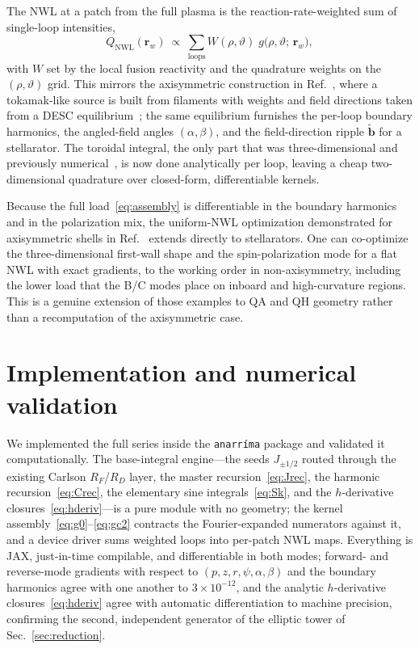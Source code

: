 \documentclass[11pt]{article}
\newcommand{\rw}{\bm{r}_w}
\newcommand{\bperp}{\tilde{\bm{b}}}
\newcommand{\NWL}{\mathrm{NWL}}
\newcommand{\Ja}[1]{J_{#1}}
\begin{document}
The NWL at a patch from the full plasma is the reaction-rate-weighted sum of single-loop intensities,
\begin{equation}
Q_{\NWL}(\rw)\ \propto\ \sum_{\text{loops}} W(\rho,\vartheta)\;g\big(\rho,\vartheta;\,\rw\big),
\label{eq:assembly}
\end{equation}
with $W$ set by the local fusion reactivity and the quadrature weights on the $(\rho,\vartheta)$ grid. This mirrors the axisymmetric construction in Ref.~\cite{schwartz2025}, where a tokamak-like source is built from filaments with weights and field directions taken from a DESC equilibrium~\cite{desc2023}; the same equilibrium furnishes the per-loop boundary harmonics, the angled-field angles $(\alpha,\beta)$, and the field-direction ripple $\bperp$ for a stellarator. The toroidal integral, the only part that was three-dimensional and previously numerical~\cite{lion2022}, is now done analytically per loop, leaving a cheap two-dimensional quadrature over closed-form, differentiable kernels.

Because the full load~\eqref{eq:assembly} is differentiable in the boundary harmonics and in the polarization mix, the uniform-NWL optimization demonstrated for axisymmetric shells in Ref.~\cite{schwartz2025} extends directly to stellarators. One can co-optimize the three-dimensional first-wall shape and the spin-polarization mode for a flat NWL with exact gradients, to the working order in non-axisymmetry, including the lower load that the B/C modes place on inboard and high-curvature regions. This is a genuine extension of those examples to QA and QH geometry rather than a recomputation of the axisymmetric case.

\section{Implementation and numerical validation}
\label{sec:validation}

We implemented the full series inside the \texttt{anarr\'ima} package and validated it computationally. The base-integral engine---the seeds $\Ja{\pm1/2}$ routed through the existing Carlson $R_F$/$R_D$ layer, the master recursion~\eqref{eq:Jrec}, the harmonic recursion~\eqref{eq:Crec}, the elementary sine integrals~\eqref{eq:Sk}, and the $h$-derivative closures~\eqref{eq:hderiv}---is a pure module with no geometry; the kernel assembly~\eqref{eq:g0}--\eqref{eq:gc2} contracts the Fourier-expanded numerators against it, and a device driver sums weighted loops into per-patch NWL maps. Everything is JAX, just-in-time compilable, and differentiable in both modes; forward- and reverse-mode gradients with respect to $(p,z,r,\psi,\alpha,\beta)$ and the boundary harmonics agree with one another to $3\times10^{-12}$, and the analytic $h$-derivative closures~\eqref{eq:hderiv} agree with automatic differentiation to machine precision, confirming the second, independent generator of the elliptic tower of Sec.~\ref{sec:reduction}.
\end{document}

